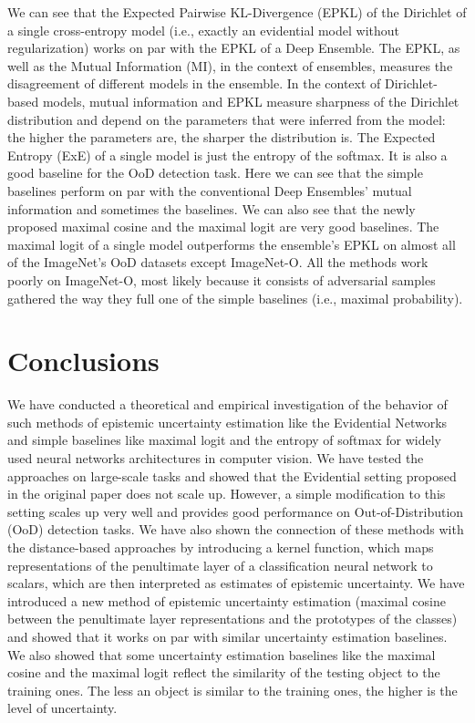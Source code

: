 \documentclass{article}
\begin{document}
We can see that the Expected Pairwise KL-Divergence (EPKL) of the Dirichlet of a single cross-entropy model (i.e., exactly an evidential model without regularization) works on par with the EPKL of a Deep Ensemble.
The EPKL, as well as the Mutual Information (MI), in the context of ensembles, measures the disagreement of different models in the ensemble.
In the context of Dirichlet-based models, mutual information and EPKL measure sharpness of the Dirichlet distribution and depend on the parameters that were inferred from the model: the higher the parameters are, the sharper the distribution is.
The Expected Entropy (ExE) of a single model is just the entropy of the softmax.
It is also a good baseline for the OoD detection task.
Here we can see that the simple baselines perform on par with the conventional Deep Ensembles' mutual information and sometimes the baselines.
We can also see that the newly proposed maximal cosine and the maximal logit are very good baselines.
The maximal logit of a single model outperforms the ensemble's EPKL on almost all of the ImageNet's OoD datasets except ImageNet-O.
All the methods work poorly on ImageNet-O, most likely because it consists of adversarial samples gathered the way they full one of the simple baselines (i.e., maximal probability).

\section{Conclusions}
\label{section:conclusion}
We have conducted a theoretical and empirical investigation of the behavior of such methods of epistemic uncertainty estimation like the Evidential Networks and simple baselines like maximal logit and the entropy of softmax for widely used neural networks architectures in computer vision.
We have tested the approaches on large-scale tasks and showed that the Evidential setting proposed in the original paper does not scale up.
However, a simple modification to this setting scales up very well and provides good performance on Out-of-Distribution (OoD) detection tasks.
We have also shown the connection of these methods with the distance-based approaches by introducing a kernel function, which maps representations of the penultimate layer of a classification neural network to scalars, which are then interpreted as estimates of epistemic uncertainty.
We have introduced a new method of epistemic uncertainty estimation (maximal cosine between the penultimate layer representations and the prototypes of the classes) and showed that it works on par with similar uncertainty estimation baselines.
We also showed that some uncertainty estimation baselines like the maximal cosine and the maximal logit reflect the similarity of the testing object to the training ones. The less an object is similar to the training ones, the higher is the level of uncertainty.

\newpage


\end{document}
